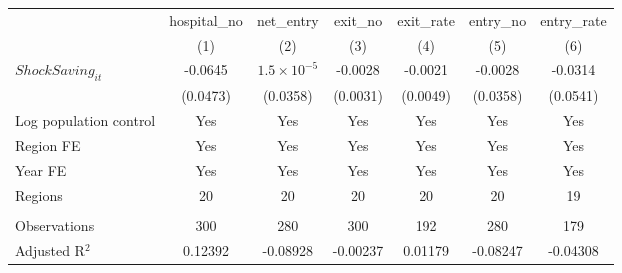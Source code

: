 \begingroup
\centering
\begin{tabular}{lcccccc}
   \toprule
                          & hospital\_no  & net\_entry           & exit\_no  & exit\_rate  & entry\_no  & entry\_rate \\    
                          & (1)           & (2)                  & (3)       & (4)         & (5)        & (6)\\  
   \midrule 
   $ShockSaving_{it}$     & -0.0645       & $1.5\times 10^{-5}$  & -0.0028   & -0.0021     & -0.0028    & -0.0314\\   
                          & (0.0473)      & (0.0358)             & (0.0031)  & (0.0049)    & (0.0358)   & (0.0541)\\   
   Log population control & Yes           & Yes                  & Yes       & Yes         & Yes        & Yes\\  
   Region FE              & Yes           & Yes                  & Yes       & Yes         & Yes        & Yes\\  
   Year FE                & Yes           & Yes                  & Yes       & Yes         & Yes        & Yes\\  
   Regions                & 20            & 20                   & 20        & 20          & 20         & 19\\  
    \\
   Observations           & 300           & 280                  & 300       & 192         & 280        & 179\\  
   Adjusted R$^2$         & 0.12392       & -0.08928             & -0.00237  & 0.01179     & -0.08247   & -0.04308\\  
   \bottomrule
\end{tabular}
\par\endgroup
